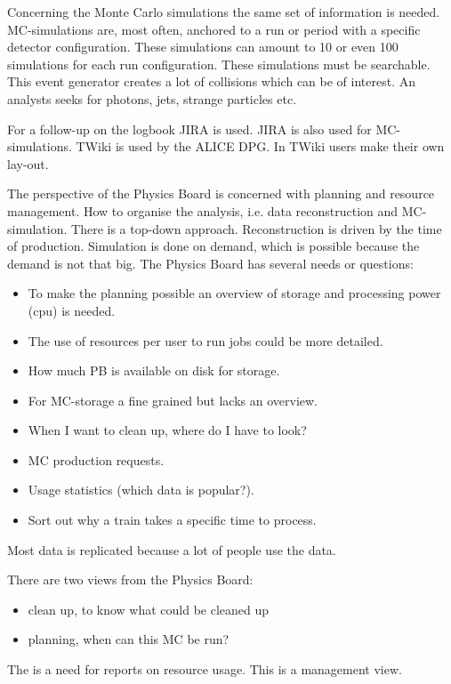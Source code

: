 Concerning the Monte Carlo simulations the same set of information is needed. MC-simulations are, most often, anchored to a run or period with a specific detector configuration. These simulations can amount to 10 or even 100 simulations for each run configuration. These simulations must be searchable. This event generator creates a lot of collisions which can be of interest. An analysts seeks for photons, jets, strange particles etc.

For a follow-up on the logbook JIRA is used. JIRA is also used for MC-simulations. TWiki is used by the ALICE DPG. In TWiki users make their own lay-out. 

The perspective of the Physics Board is concerned with planning and resource management. How to organise the analysis, i.e. data reconstruction and MC-simulation. There is a top-down approach. Reconstruction is driven by the time of production. Simulation is done on demand, which is possible because the demand is not that big. The Physics Board has several needs or questions:
\begin{itemize}
  \item To make the planning possible an overview of storage and processing power (cpu) is needed. 
  \item The use of resources per user to run jobs could be more detailed.
  \item How much PB is available on disk for storage.
  \item For MC-storage a fine grained but lacks an overview.
  \item When I want to clean up, where do I have to look?
  \item MC production requests.
  \item Usage statistics (which data is popular?).
  \item Sort out why a train takes a specific time to process.
\end{itemize}
Most data is replicated because a lot of people use the data.

There are two views from the Physics Board:
\begin{itemize}
  \item clean up, to know what could be cleaned up
  \item planning, when can this MC be run?
\end{itemize}
The is a need for reports on resource usage. This is a management view.






